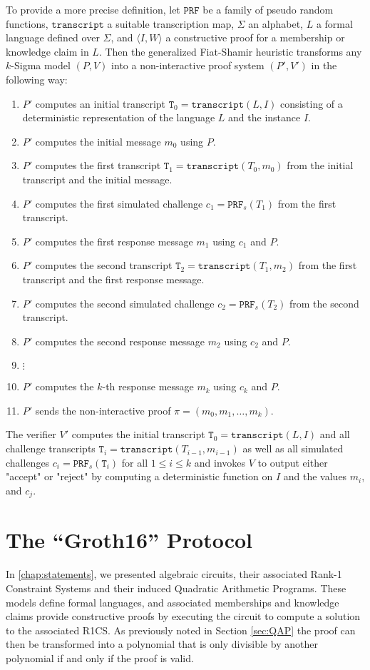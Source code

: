 To provide a more precise definition, let $\mathtt{PRF}$ be a family of pseudo random functions, $\mathtt{transcript}$ a suitable transcription map, $\Sigma$ an alphabet, $L$ a formal language defined over $\Sigma$, and $\langle I, W\rangle$ a constructive proof for a membership or knowledge claim in $L$. Then the generalized Fiat-Shamir heuristic transforms any $k$-Sigma model $(P,V)$ into a non-interactive proof system $(P',V')$ in the following way:
\begin{enumerate}
\label{def_sigma-model-fiat-shamir}
\item $P'$ computes an initial transcript $\mathtt{T}_0 = \mathtt{transcript}(L,I)$ consisting of a deterministic representation of the language $L$ and the instance $I$.
\item $P'$ computes the initial message $m_0$ using $P$.
\item $P'$ computes the first transcript $\mathtt{T}_1 = \mathtt{transcript}(T_0,m_0)$ from the initial transcript and the initial message.
\item $P'$ computes the first simulated challenge $c_1=\mathtt{PRF}_s(T_1)$ from the first transcript.
\item $P'$ computes the first response message $m_1$ using $c_1$ and $P$.
\item $P'$ computes the second transcript $\mathtt{T}_2 = \mathtt{transcript}(T_1,m_2)$ from the first transcript and the first response message.
\item $P'$ computes the second simulated challenge $c_2=\mathtt{PRF}_s(T_2)$ from the second transcript.
\item $P'$ computes the second response message $m_2$ using $c_2$ and $P$.
\item $\vdots$
\item $P'$ computes the $k$-th response message $m_{k}$ using $c_k$ and $P$.
\item $P'$ sends the non-interactive proof $\pi=(m_0,m_1,\ldots,m_{k})$.
\end{enumerate}
The verifier $V'$ computes the initial transcript $\mathtt{T}_0 = \mathtt{transcript}(L,I)$ and all challenge transcripts $\mathtt{T}_i = \mathtt{transcript}(T_{i-1},m_{i-1})$ as well as all simulated challenges $c_i=\mathtt{PRF}_s(\mathtt{T}_i)$ for all $1\leq i \leq k$ and invokes $V$ to output either "accept" or "reject" by computing a deterministic function on $I$ and the values $m_i$, and $c_j$.



\section{The ``Groth16'' Protocol}
\label{sec:gorth_16}
 In \chaptname{} \ref{chap:statements}, we presented algebraic circuits, their associated Rank-1 Constraint Systems and their induced Quadratic Arithmetic Programs. These models define formal languages, and associated memberships and knowledge claims provide constructive proofs by executing the circuit to compute a solution to the associated R1CS. As previously noted in Section \ref{sec:QAP} the proof can then be transformed into a polynomial that is only divisible by another polynomial if and only if the proof is valid. 
 
